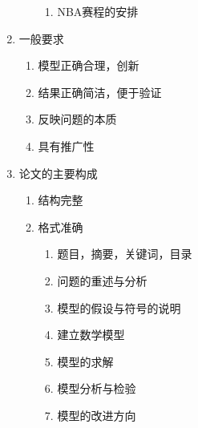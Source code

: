\begin{enumerate}
\begin{enumerate}
        \begin{enumerate}
        \item NBA赛程的安排
        \end{enumerate}
    \end{enumerate}
\item 一般要求
    \begin{enumerate}
    \item 模型正确合理，创新
    \item 结果正确简洁，便于验证
    \item 反映问题的本质
    \item 具有推广性
    \end{enumerate}
\item 论文的主要构成
    \begin{enumerate}
    \item 结构完整
    \item 格式准确
        \begin{enumerate}
        \item 题目，摘要，关键词，目录
        \item 问题的重述与分析
        \item 模型的假设与符号的说明
        \item 建立数学模型
        \item 模型的求解
        \item 模型分析与检验
        \item 模型的改进方向
        \end{enumerate}
    \end{enumerate}
\end{enumerate}